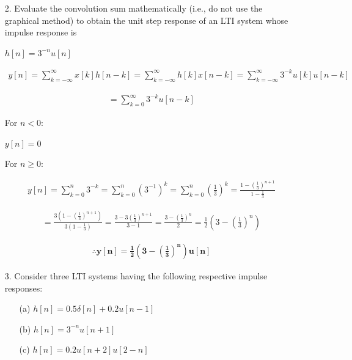\documentclass[fleqn]{article}
\begin{document}
\begin{enumerate}
		\item[2.] Evaluate the convolution sum mathematically (i.e., do not use the graphical method) to obtain the unit step response of an LTI system whose impulse response is
		
		$h[n] = 3^{-n}u[n]$
		
		\begin{align*}
			y[n] = \sum_{k = -\infty}^{\infty}{x[k]h[n-k]} = \sum_{k = -\infty}^{\infty}{h[k]x[n-k]} = \sum_{k = -\infty}^{\infty}{3^{-k}u[k]u[n-k]}
		\end{align*}
		
		\begin{align*}
			= \sum_{k = 0}^{\infty}{3^{-k}u[n-k]}
		\end{align*}
		
		For $n < 0$:
		
		$y[n] = 0$
		
		\break
		
		For $n \geq 0$:
		
		\begin{align*}
			y[n] = \sum_{k = 0}^{n}{3^{-k}} = \sum_{k = 0}^{n}{(3^{-1})^k} = \sum_{k = 0}^{n}{\left(\frac{1}{3}\right)^k} = \frac{1-\left(\frac{1}{3}\right)^{n+1}}{1-\frac{1}{3}}
		\end{align*}
		
		\begin{align*}
			 = \frac{3\left(1-\left(\frac{1}{3}\right)^{n+1}\right)}{3\left(1-\frac{1}{3}\right)} = \frac{3-3\left(\frac{1}{3}\right)^{n+1}}{3-1} = \frac{3-\left(\frac{1}{3}\right)^{n}}{2} = \frac{1}{2}\left(3-\left(\frac{1}{3}\right)^{n}\right)
		\end{align*}
		
		\begin{align*}
			\mathbf{\therefore y[n] = \frac{1}{2}\left(3-\left(\frac{1}{3}\right)^{n}\right)u[n]}
		\end{align*}
		
		\item[3.] Consider three LTI systems having the following respective impulse responses:
		
			\begin{enumerate}
				\item[(a)] $h[n] = 0.5\delta[n] + 0.2u[n-1]$
				
				\item[(b)] $h[n] = 3^{-n}u[n+1]$
				
				\item[(c)] $h[n] = 0.2u[n+2]u[2-n]$
				

\end{enumerate}
\end{enumerate}
\end{document}
